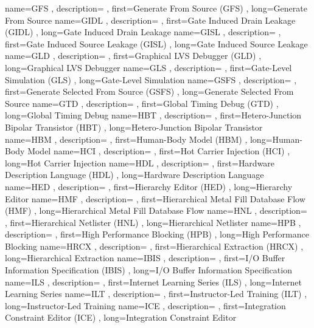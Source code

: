 { name={GFS}
, description={}
, first={Generate From Source (GFS)}
, long={Generate From Source}
}
{ name={GIDL}
, description={}
, first={Gate Induced Drain Leakage (GIDL)}
, long={Gate Induced Drain Leakage}
}
{ name={GISL}
, description={}
, first={Gate Induced Source Leakage (GISL)}
, long={Gate Induced Source Leakage}
}
{ name={GLD}
, description={}
, first={Graphical LVS Debugger (GLD)}
, long={Graphical LVS Debugger}
}
{ name={GLS}
, description={}
, first={Gate-Level Simulation (GLS)}
, long={Gate-Level Simulation}
}
{ name={GSFS}
, description={}
, first={Generate Selected From Source (GSFS)}
, long={Generate Selected From Source}
}
{ name={GTD}
, description={}
, first={Global Timing Debug (GTD)}
, long={Global Timing Debug}
}
{ name={HBT}
, description={}
, first={Hetero-Junction Bipolar Transistor (HBT)}
, long={Hetero-Junction Bipolar Transistor}
}
{ name={HBM}
, description={}
, first={Human-Body Model (HBM)}
, long={Human-Body Model}
}
{ name={HCI}
, description={}
, first={Hot Carrier Injection (HCI)}
, long={Hot Carrier Injection}
}
{ name={HDL}
, description={}
, first={Hardware Description Language (HDL)}
, long={Hardware Description Language}
}
{ name={HED}
, description={}
, first={Hierarchy Editor (HED)}
, long={Hierarchy Editor}
}
{ name={HMF}
, description={}
, first={Hierarchical Metal Fill Database Flow (HMF)}
, long={Hierarchical Metal Fill Database Flow}
}
{ name={HNL}
, description={}
, first={Hierarchical Netlister (HNL)}
, long={Hierarchical Netlister}
}
{ name={HPB}
, description={}
, first={High Performance Blocking (HPB)}
, long={High Performance Blocking}
}
{ name={HRCX}
, description={}
, first={Hierarchical Extraction (HRCX)}
, long={Hierarchical Extraction}
}
{ name={IBIS}
, description={}
, first={I/O Buffer Information Specification (IBIS)}
, long={I/O Buffer Information Specification}
}
{ name={ILS}
, description={}
, first={Internet Learning Series (ILS)}
, long={Internet Learning Series}
}
{ name={ILT}
, description={}
, first={Instructor-Led Training (ILT)}
, long={Instructor-Led Training}
}
{ name={ICE}
, description={}
, first={Integration Constraint Editor (ICE)}
, long={Integration Constraint Editor}
}
